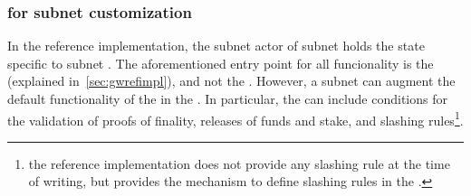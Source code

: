 \subsubsection{\sa for subnet customization}
\label{sec:refimplsa} In the reference implementation, the subnet actor of subnet  holds the state specific to subnet . The aforementioned entry point for all funcionality is the \gw (explained in~\cref{sec:gwrefimpl}), and not the \sa. However, a subnet can augment the default functionality of the \gw in the \sa. In particular, the \sa can include conditions for the validation of proofs of finality, releases of funds and stake, and slashing rules\footnote{the reference implementation does not provide any slashing rule at the time of writing, but provides the mechanism to define slashing rules in the \sa.}.


